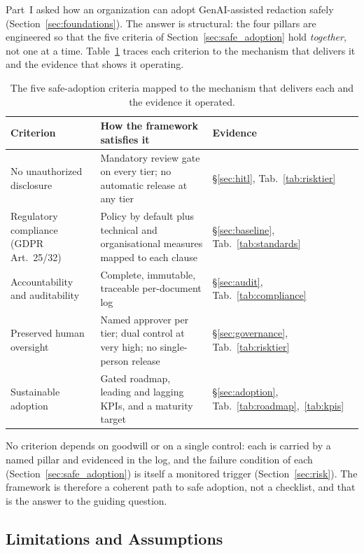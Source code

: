 \documentclass[12pt,a4paper]{article}
\begin{document}
Part~I asked how an organization can adopt GenAI-assisted redaction safely (Section~\ref{sec:foundations}). The answer is structural: the four pillars are engineered so that the five criteria of Section~\ref{sec:safe_adoption} hold \emph{together}, not one at a time. Table~\ref{tab:answer} traces each criterion to the mechanism that delivers it and the evidence that shows it operating.

\begin{table}[H]
\centering
\small
{}
\begin{tabular}{@{} p{3.4cm} p{7.2cm} p{3.2cm} @{}}
\toprule
\textbf{\color{accentdark}Criterion} & \textbf{\color{accentdark}How the framework satisfies it} & \textbf{\color{accentdark}Evidence} \\
\midrule
No unauthorized disclosure & Mandatory review gate on every tier; no automatic release at any tier & \S\ref{sec:hitl}, Tab.~\ref{tab:risktier} \\
Regulatory compliance (GDPR Art.~25/32) & Policy by default plus technical and organisational measures mapped to each clause & \S\ref{sec:baseline}, Tab.~\ref{tab:standards} \\
Accountability and auditability & Complete, immutable, traceable per-document log & \S\ref{sec:audit}, Tab.~\ref{tab:compliance} \\
Preserved human oversight & Named approver per tier; dual control at very high; no single-person release & \S\ref{sec:governance}, Tab.~\ref{tab:risktier} \\
Sustainable adoption & Gated roadmap, leading and lagging KPIs, and a maturity target & \S\ref{sec:adoption}, Tab.~\ref{tab:roadmap},~\ref{tab:kpis} \\
\bottomrule
\end{tabular}
\caption{The five safe-adoption criteria mapped to the mechanism that delivers each and the evidence it operated.}
\label{tab:answer}
\end{table}

No criterion depends on goodwill or on a single control: each is carried by a named pillar and evidenced in the log, and the failure condition of each (Section~\ref{sec:safe_adoption}) is itself a monitored trigger (Section~\ref{sec:risk}). The framework is therefore a coherent path to safe adoption, not a checklist, and that is the answer to the guiding question.

\subsection{Limitations and Assumptions}
\end{document}

